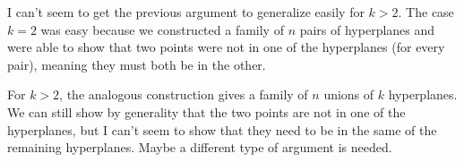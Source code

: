 I can't seem to get the previous argument to generalize easily for $k>2$. The case $k=2$ was easy because we constructed a family of $n$ pairs of hyperplanes and were able to show that two points were not in one of the hyperplanes (for every pair), meaning they must both be in the other.

For $k>2$, the analogous construction gives a family of $n$ unions of $k$ hyperplanes. We can still show by generality that the two points are not in one of the hyperplanes, but I can't seem to show that they need to be in the same of the remaining hyperplanes. Maybe a different type of argument is needed.


